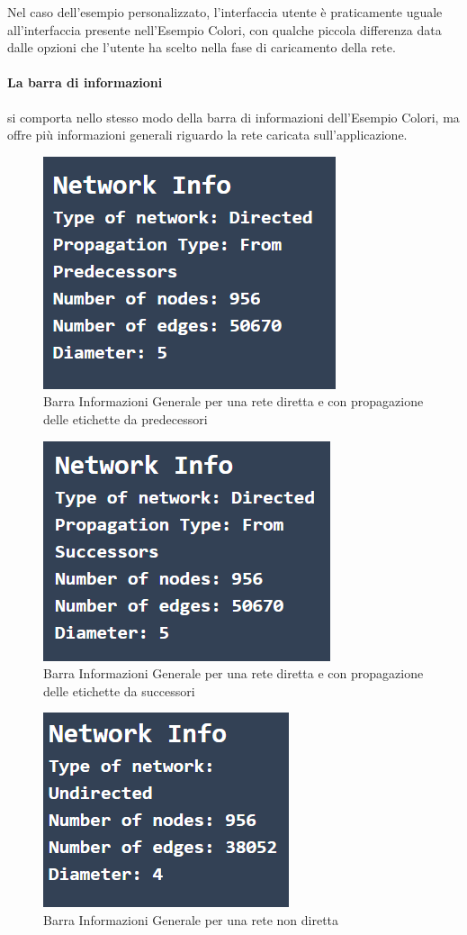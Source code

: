 \documentclass[a4paper,12pt]{report}
\begin{document}
			Nel caso dell'esempio personalizzato, l'interfaccia utente è praticamente uguale all'interfaccia presente nell'Esempio Colori, con qualche piccola differenza data dalle opzioni che l'utente ha scelto nella fase di caricamento della rete.

			\paragraph*{La barra di informazioni} si comporta nello stesso modo della barra di informazioni dell'Esempio Colori, ma offre più informazioni generali riguardo la rete caricata sull'applicazione.
			
			\begin{center}
				\begin{figure}[H]
				\centering
				\includegraphics[width=0.5\linewidth]{infobargeneralcustom}
				\caption{Barra Informazioni Generale per una rete diretta e con propagazione delle etichette da predecessori}
				\end{figure}
				\begin{figure}[H]
				\centering
				\includegraphics[width=0.5\linewidth]{infobargeneralcustomdirectedsuccessors}
				\caption{Barra Informazioni Generale per una rete diretta e con propagazione delle etichette da successori}
				\end{figure}
				\begin{figure}[H]
				\centering
				\includegraphics[width=0.5\linewidth]{infobargeneralcustomundirected}
				\caption{Barra Informazioni Generale per una rete non diretta}
				\end{figure}
			\end{center}
\end{document}
